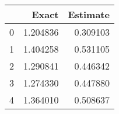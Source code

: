 \begin{tabular}{lrr}
\toprule
 & Exact & Estimate \\
\midrule
0 & 1.204836 & 0.309103 \\
1 & 1.404258 & 0.531105 \\
2 & 1.290841 & 0.446342 \\
3 & 1.274330 & 0.447880 \\
4 & 1.364010 & 0.508637 \\
\bottomrule
\end{tabular}
